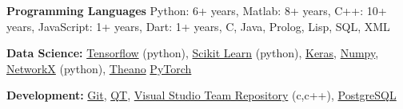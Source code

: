 \textbf{Programming Languages}
Python: 6+ years, Matlab: 8+ years, C++: 10+ years, JavaScript: 1+ years, Dart: 1+ years, C, Java, Prolog, Lisp, SQL, XML



\textbf{Data Science:} \href{https://www.tensorflow.org/}{Tensorflow}
(python), \href{http://scikit-learn.org}{Scikit Learn} (python),
\href{https://keras.io/}{Keras},
\href{http://www.numpy.org/}{Numpy},
\href{https://networkx.github.io/}{NetworkX} (python),
\href{http://deeplearning.net/software/theano/}{Theano}
\href{https://pytorch.org/}{PyTorch}


\textbf{Development:} \href{https://git-scm.com/}{Git}, \href{https://www1.qt.io/qt5-8/}{QT}, \href{https://app.vsaex.visualstudio.com/me?mkt=en-US&campaign=o~msft~vsts~usercard}{Visual Studio Team Repository} (c,c++), \href{https://www.postgresql.org/}{PostgreSQL}

